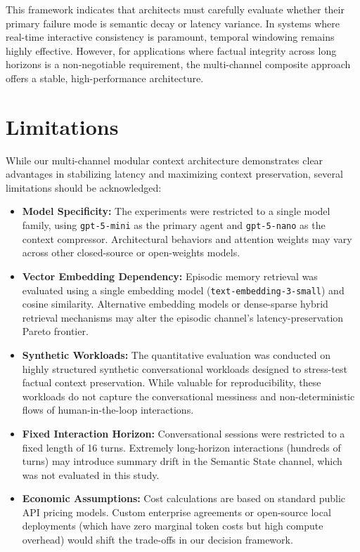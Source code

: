 \documentclass[11pt,journal,onecolumn]{article}
\begin{document}
This framework indicates that architects must carefully evaluate whether their primary failure mode is semantic decay or latency variance. In systems where real-time interactive consistency is paramount, temporal windowing remains highly effective. However, for applications where factual integrity across long horizons is a non-negotiable requirement, the multi-channel composite approach offers a stable, high-performance architecture.

\section{Limitations}
While our multi-channel modular context architecture demonstrates clear advantages in stabilizing latency and maximizing context preservation, several limitations should be acknowledged:
\begin{itemize}
    \item \textbf{Model Specificity:} The experiments were restricted to a single model family, using \texttt{gpt-5-mini} as the primary agent and \texttt{gpt-5-nano} as the context compressor. Architectural behaviors and attention weights may vary across other closed-source or open-weights models.
    \item \textbf{Vector Embedding Dependency:} Episodic memory retrieval was evaluated using a single embedding model (\texttt{text-embedding-3-small}) and cosine similarity. Alternative embedding models or dense-sparse hybrid retrieval mechanisms may alter the episodic channel's latency-preservation Pareto frontier.
    \item \textbf{Synthetic Workloads:} The quantitative evaluation was conducted on highly structured synthetic conversational workloads designed to stress-test factual context preservation. While valuable for reproducibility, these workloads do not capture the conversational messiness and non-deterministic flows of human-in-the-loop interactions.
    \item \textbf{Fixed Interaction Horizon:} Conversational sessions were restricted to a fixed length of 16 turns. Extremely long-horizon interactions (hundreds of turns) may introduce summary drift in the Semantic State channel, which was not evaluated in this study.
    \item \textbf{Economic Assumptions:} Cost calculations are based on standard public API pricing models. Custom enterprise agreements or open-source local deployments (which have zero marginal token costs but high compute overhead) would shift the trade-offs in our decision framework.
\end{itemize}
\end{document}
